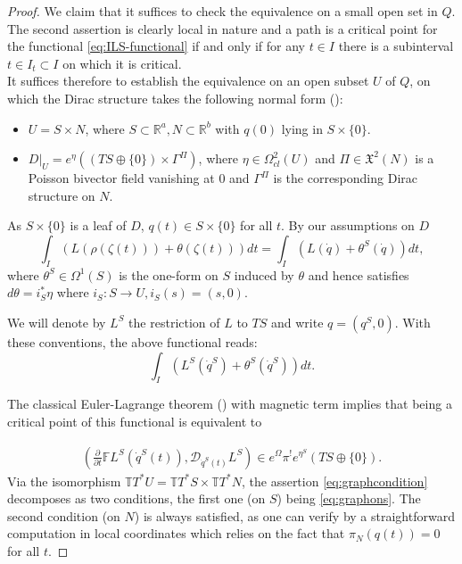 \documentclass[a4paper,12pt]{amsart}
\theoremstyle{definition}
\begin{document}
\begin{proof}
We claim that it suffices to check the equivalence on a small open set in $Q$. The second assertion is clearly local in nature and a path is a critical point for the functional \eqref{eq:ILS-functional} if and only if for any $t\in I$ there is a subinterval $t\in I_t\subset I$ on  which it is critical.\\

It suffices therefore to establish the equivalence on an open subset $U$ of $Q$, on which the Dirac structure takes the following normal form (\cite{blohmann}):

\begin{itemize}
    \item $U=S\times N$, where $S\subset \mathbb R^{a}, N\subset \mathbb R^b$ with $q(0)$ lying in $S\times \{0\}$.
    \item $D|_U=e^\eta((TS \oplus \{0\} )\times \Gamma^\Pi)$, where $\eta\in \Omega^2_{cl}(U)$ and $\Pi\in\mathfrak X^2(N)$ is a Poisson bivector field vanishing at $0$ and $\Gamma^\Pi$ is the corresponding Dirac structure on $N$.
\end{itemize}

As $S\times \{0\}$ is a leaf of $D$, $q(t)\in S\times \{0\}$ for all $t$. By our assumptions on $D$ 
$$ \int_I (L (\rho(\zeta(t))) + \theta (\zeta(t)))  dt
= \int_I (L (\dot q) + \theta^S (\dot q) ) dt,
$$
where $\theta^S\in\Omega^1(S)$ is the one-form on $S$ induced by $\theta$ and hence satisfies $d\theta=i_S^*\eta$ where $i_S:S\to U, i_S(s)=(s,0)$.

We will denote by $L^S$ the restriction of $L$ to $TS$ and write $q=(q^S, 0)$. With these conventions, the above functional reads:
$$
\int_I (L^S (\dot q^S) + \theta^S (\dot q^S))  dt.
$$

The classical Euler-Lagrange theorem {(\cite{Pontryagin})} with magnetic term implies that being a critical point of this functional is equivalent to 

\begin{align}\label{eq:graphons}
\left(\frac{\partial }{\partial t}\mathbb FL^S(\dot q^S(t)), \mathcal D_{\dot q^S(t)}L^S\right)\in e^\Omega\pi^!e^{\eta^S}(TS\oplus \{0\}).
\end{align}
Via the isomorphism $\mathbb TT^*U=\mathbb TT^*S\times \mathbb TT^*N$, the assertion \eqref{eq:graphcondition} decomposes as two conditions, the first one (on $S$) being \eqref{eq:graphons}. The second condition (on $N$) is always satisfied, as one can verify by a straightforward computation in local coordinates which relies on the fact that $\pi_N(q(t))=0$ for all $t$.



\end{proof}
\end{document}
